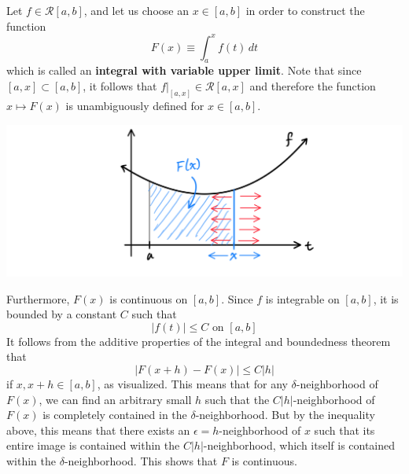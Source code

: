     \begin{definition}
      Let $f \in \mathcal{R}[a, b]$, and let us choose an $x \in [a, b]$ in order to construct the function
      \[F(x) \equiv \int_a^x f(t)\,dt\]
      which is called an \textbf{integral with variable upper limit}. Note that since $[a, x] \subset [a, b]$, it follows that $f \big|_{[a,x]} \in \mathcal{R}[a, x]$ and therefore the function $x \mapsto F(x)$ is unambiguously defined for $x \in [a, b]$. 
      \begin{center}
          \includegraphics[scale=0.27]{img/Integral_with_Variable_Upper_Limit.PNG}
      \end{center}
      Furthermore, $F(x)$ is continuous on $[a, b]$. Since $f$ is integrable on $[a, b]$, it is bounded by a constant $C$ such that
      \[|f(t)| \leq C \text{ on } [a, b]\]
      It follows from the additive properties of the integral and boundedness theorem that 
      \[|F(x + h) - F(x)| \leq C|h|\]
      if $x, x + h \in [a, b]$, as visualized. This means that for any $\delta$-neighborhood of $F(x)$, we can find an arbitrary small $h$ such that the $C|h|$-neighborhood of $F(x)$ is completely contained in the $\delta$-neighborhood. But by the inequality above, this means that there exists an $\epsilon = h$-neighborhood of $x$ such that its entire image is contained within the $C|h|$-neighborhood, which itself is contained within the $\delta$-neighborhood. This shows that $F$ is continuous. 
    \end{definition}

